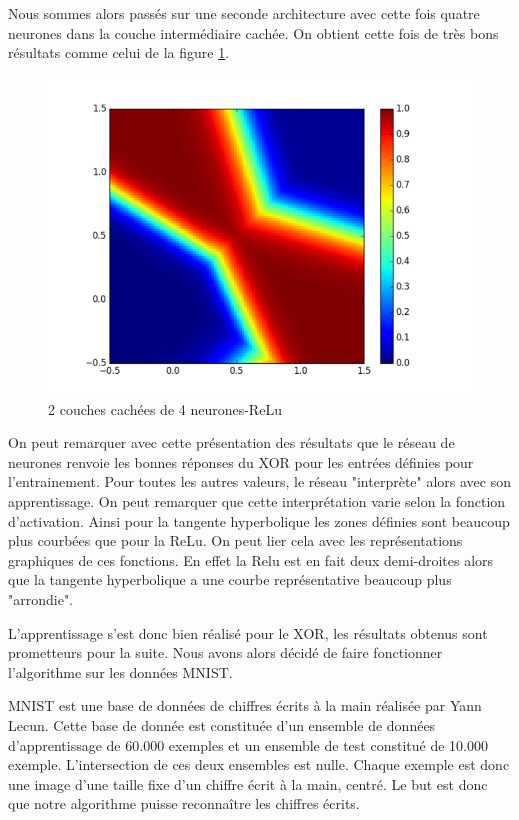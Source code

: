 Nous sommes alors passés sur une seconde architecture avec cette fois quatre neurones dans la couche intermédiaire cachée. On obtient cette fois de très bons résultats comme celui de la figure \ref{xor_relu_2_4}.

\begin{figure}[!h]
\begin{center}
\includegraphics[scale=0.6]{images/xor_relu_2_4.png}
\caption{2 couches cachées de 4 neurones-ReLu}
\label{xor_relu_2_4}
\end{center}
\end{figure}

On peut remarquer avec cette présentation des résultats que le réseau de neurones renvoie les bonnes réponses du XOR pour les entrées définies pour l'entrainement. Pour toutes les autres valeurs,  le réseau "interprète" alors avec son apprentissage. On peut remarquer que cette interprétation varie selon la fonction d'activation. Ainsi pour la tangente hyperbolique les zones définies sont beaucoup plus courbées que pour la ReLu. On peut lier cela avec les représentations graphiques de ces fonctions. En effet la Relu est en fait deux demi-droites alors que la tangente hyperbolique a une courbe représentative beaucoup plus "arrondie".

L'apprentissage s'est donc bien réalisé pour le XOR, les résultats obtenus sont prometteurs pour la suite. Nous avons alors décidé de faire fonctionner l'algorithme sur les données MNIST.

MNIST est une base de données de chiffres écrits à la main réalisée par Yann Lecun. Cette base de donnée est constituée d'un ensemble de données d'apprentissage de 60.000 exemples et un ensemble de test constitué de 10.000 exemple. L'intersection de ces deux ensembles est nulle. Chaque exemple est donc une image d'une taille fixe d'un chiffre écrit à la main, centré. Le but est donc que notre algorithme puisse reconnaître les chiffres écrits.

